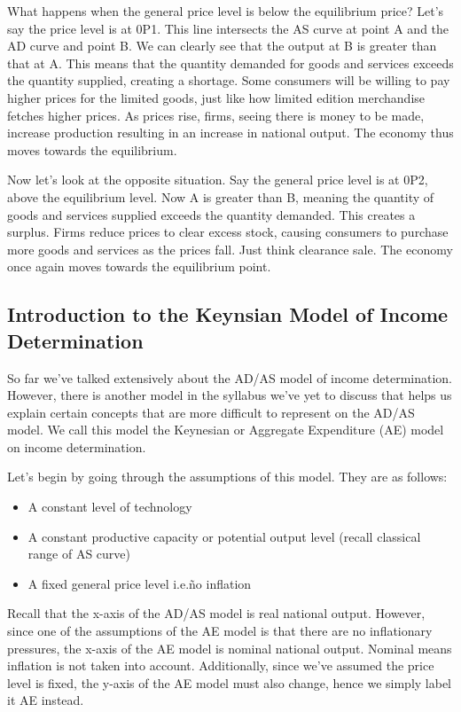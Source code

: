 What happens when the general price level is below the equilibrium price? Let’s say the price level is at 0P1. This line intersects the AS curve at point A and the AD curve and point B. We can clearly see that the output at B is greater than that at A. This means that the quantity demanded for goods and services exceeds the quantity supplied, creating a shortage. Some consumers will be willing to pay higher prices for the limited goods, just like how limited edition merchandise fetches higher prices. As prices rise, firms, seeing there is money to be made, increase production resulting in an increase in national output. The economy thus moves towards the equilibrium. 

Now let’s look at the opposite situation. Say the general price level is at 0P2, above the equilibrium level. Now A is greater than B, meaning the quantity of goods and services supplied exceeds the quantity demanded. This creates a surplus. Firms reduce prices to clear excess stock, causing consumers to purchase more goods and services as the prices fall. Just think clearance sale. The economy once again moves towards the equilibrium point. 
\subsection{Introduction to the Keynsian Model of Income Determination}
So far we’ve talked extensively about the AD/AS model of income determination. However, there is another model in the syllabus we’ve yet to discuss that helps us explain certain concepts that are more difficult to represent on the AD/AS model. We call this model the Keynesian or Aggregate Expenditure (AE) model on income determination. 

Let’s begin by going through the assumptions of this model. They are as follows:
\begin{itemize}
\item A constant level of technology
\item A constant productive capacity or potential output level (recall classical range of AS curve)
\item A fixed general price level i.e.\~no inflation
\end{itemize}
Recall that the x-axis of the AD/AS model is real national output. However, since one of the assumptions of the AE model is that there are no inflationary pressures, the x-axis of the AE model is nominal national output. Nominal means inflation is not taken into account. Additionally, since we’ve assumed the price level is fixed, the y-axis of the AE model must also change, hence we simply label it AE instead. 

